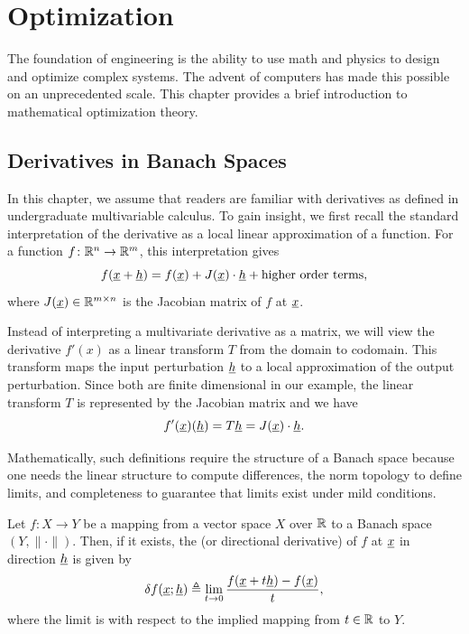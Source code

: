 \chapter{Optimization}



The foundation of engineering is the ability to use math and physics to design and optimize complex systems.
The advent of computers has made this possible on an unprecedented scale.
This chapter provides a brief introduction to mathematical optimization theory.

\section{Derivatives in Banach Spaces}

In this chapter, we assume that readers are familiar with derivatives as defined in undergraduate multivariable calculus.
To gain insight, we first recall the standard interpretation of the derivative as a local linear approximation of a function.
For a function $f\colon \mathbb{R}^n \to \mathbb{R}^m$, this interpretation gives 
\[ f(\underline{x} + \underline{h}) = f(\underline{x}) + J(\underline{x}) \cdot \underline{h} + \text{higher order terms}, \]
where $J(\underline{x})\in \mathbb{R}^{m\times n}$ is the Jacobian matrix of $f$ at $\underline{x}$.

Instead of interpreting a multivariate derivative as a matrix,  we will view the derivative $f'(x)$ as a linear transform $T$ from the domain to codomain.
This transform maps the input perturbation $\underline{h}$ to a local approximation of the output perturbation.
Since both are finite dimensional in our example, the linear transform $T$ is represented by the Jacobian matrix and we have $$f'(\underline{x})(\underline{h}) = T \underline{h} = J(\underline{x})\cdot \underline{h}.$$ 

Mathematically, such definitions require the structure of a Banach space because one needs the linear structure to compute differences, the norm topology to define limits, and completeness to guarantee that limits exist under mild conditions.

\begin{definition}
Let $f \colon X \rightarrow Y$ be a mapping from a vector space $X$ over $\mathbb{R}$ to a Banach space $(Y,\|\cdot\|)$.
Then, if it exists, the  (or directional derivative) of $f$ at $\underline{x}$ in direction $\underline{h}$ is given by
\[ \delta f (\underline{x};\underline{h}) \triangleq \lim_{t \to 0} \frac{f(\underline{x}+t \underline{h}) - f(\underline{x})}{t}, \]
where the limit is with respect to the implied mapping from $t\in \mathbb{R}$ to $Y$.
\end{definition}

